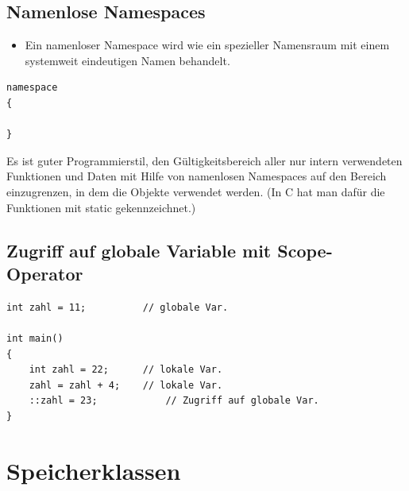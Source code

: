 \subsection{Namenlose Namespaces}
\vspace{-\baselineskip}
\begin{minipage}{0.8\linewidth}
	\begin{itemize}
		\item Ein namenloser Namespace wird wie ein spezieller Namensraum mit einem systemweit eindeutigen Namen behandelt.
	\end{itemize}
\end{minipage}%
\hspace{0.04\linewidth}
\begin{minipage}{0.15\linewidth}
\begin{lstlisting}
namespace
{

}
\end{lstlisting}
\end{minipage}
\begin{hinweis}
	Es ist guter Programmierstil, den Gültigkeitsbereich aller nur intern verwendeten Funktionen und Daten mit Hilfe von namenlosen Namespaces auf den Bereich einzugrenzen, in dem die Objekte verwendet werden. (In C hat man dafür die Funktionen mit static gekennzeichnet.)
\end{hinweis}


\subsection{Zugriff auf globale Variable mit Scope-Operator}
\vspace{-\baselineskip}
\begin{minipage}{0.6\linewidth}
\begin{lstlisting}
int zahl = 11;			// globale Var.

int main()
{
	int zahl = 22;		// lokale Var.
	zahl = zahl + 4;	// lokale Var.
	::zahl = 23;			// Zugriff auf globale Var.
}
\end{lstlisting}
\end{minipage}

\section{Speicherklassen}

